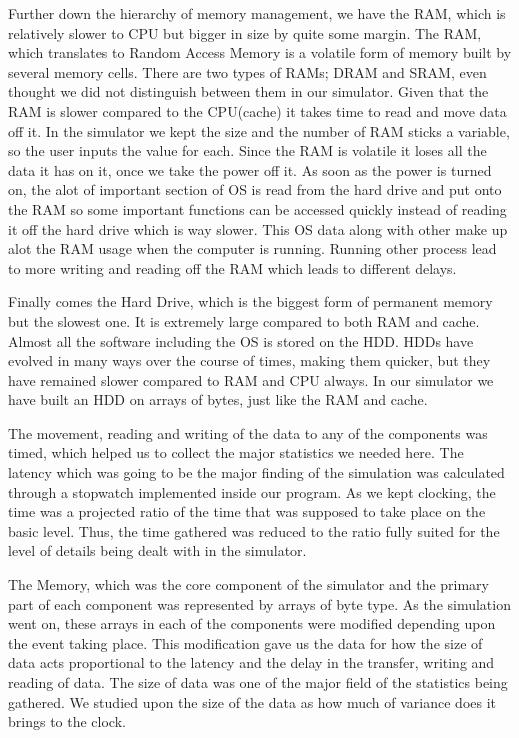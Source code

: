 \documentclass[12pt]{article}
\begin{document}
Further down the hierarchy of memory management, we have the RAM, which is relatively slower to CPU but bigger
in size by quite some margin. The RAM, which translates to Random Access Memory is a volatile form of memory
built by several memory cells. There are two types of RAMs; DRAM and SRAM, even thought we did not distinguish
between them in our simulator. Given that the RAM is slower compared to the CPU(cache) it takes time to read
and move data off it. In the simulator we kept the size and the number of RAM sticks a variable, so
the user inputs the value for each. Since the RAM is volatile it loses all the data it has on it, once we
take the power off it. As soon as the power is turned on, the alot of important section of OS is read from
the hard drive and put onto the RAM so some important functions can be accessed quickly instead of reading
it off the hard drive which is way slower. This OS data along with other make up alot the RAM usage when the
computer is running. Running other process lead to more writing and reading off the RAM which leads to different
delays.

Finally comes the Hard Drive, which is the biggest form of permanent memory but the slowest one. It is
extremely large compared to both RAM and cache. Almost all the software including the OS is stored on
the HDD. HDDs have evolved in many ways over the course of times, making them quicker, but they have
remained slower compared to RAM and CPU always. In our simulator we have built an HDD on arrays of bytes,
just like the RAM and cache. 

The movement, reading and writing of the data to any of the components was timed, which helped
us to  collect the major statistics we needed  here. The latency which was  going to be the
major finding of the simulation was calculated through a stopwatch implemented
inside our program. As we kept clocking, the time was a projected ratio of the time that was supposed to
take place on the basic level. Thus, the time gathered was reduced to the ratio fully suited for the
level of details being dealt with in the simulator.

The Memory, which was the core component of the simulator and the primary part of each component
was represented by arrays of byte type. As the simulation went on, these arrays in each of the components
were modified depending upon the event taking place. This modification gave us the data for how the size
of data acts proportional to the latency and the delay in the transfer, writing and reading of data. The size
of data was one of the major field of the statistics being gathered. We studied upon the size of the
data as how much of variance does it brings to the clock.
\end{document}
